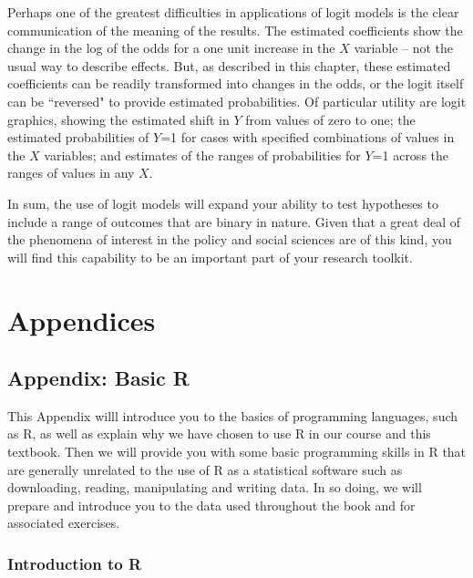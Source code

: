 \documentclass[11pt,openany]{book}\usepackage[]{graphicx}\usepackage[]{color}
\begin{document}
{Perhaps one of the greatest difficulties in applications of logit models is the clear communication of the meaning of the results. The estimated coefficients show the change in the log of the odds for a one unit increase in the $X$ variable -- not the usual way to describe effects. But, as described in this chapter, these estimated coefficients can be readily transformed into changes in the odds, or the logit itself can be ``reversed" to provide estimated probabilities.  Of particular utility are logit graphics, showing the estimated shift in $Y$ from values of zero to one; the estimated probabilities of $Y$=1 for cases with specified combinations of values in the $X$ variables; and estimates of the ranges of probabilities for $Y$=1 across the ranges of values in any $X$. 

In sum, the use of logit models will expand your ability to test hypotheses to include a range of outcomes that are binary in nature. Given that a great deal of the phenomena of interest in the policy and social sciences are of this kind, you will find this capability to be an important part of your research toolkit. 

\part{Appendices}




\chapter{Appendix: Basic R}

This Appendix willl introduce you to the basics of programming languages, such as  R, as well as explain why we have chosen to use R in our course and this textbook. Then we will provide you with some basic programming skills in R that are generally unrelated to the use of R as a statistical software such as downloading, reading, manipulating and writing data. In so doing, we will prepare and introduce you to the data used throughout the book and for associated exercises. 

\section{Introduction to R}

}
\end{document}
